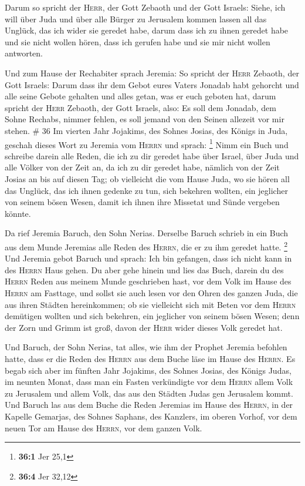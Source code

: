  Darum so spricht der \textsc{Herr}, der Gott Zebaoth und
der Gott Israels: Siehe, ich will über Juda und über alle Bürger zu
Jerusalem kommen lassen all das Unglück, das ich wider sie geredet habe,
darum dass ich zu ihnen geredet habe und sie nicht wollen hören, dass
ich gerufen habe und sie mir nicht wollen antworten.

 Und zum Hause der Rechabiter sprach Jeremia: So spricht
der \textsc{Herr} Zebaoth, der Gott Israels: Darum dass ihr dem Gebot
eures Vaters Jonadab habt gehorcht und alle seine Gebote gehalten und
alles getan, was er euch geboten hat,  darum spricht der
\textsc{Herr} Zebaoth, der Gott Israels, also: Es soll dem Jonadab, dem
Sohne Rechabs, nimmer fehlen, es soll jemand von den Seinen allezeit vor
mir stehen. \# 36  Im vierten Jahr Jojakims, des Sohnes
Josias, des Königs in Juda, geschah dieses Wort zu Jeremia vom
\textsc{Herrn} und sprach: \footnote{\textbf{36:1} Jer 25,1}
 Nimm ein Buch und schreibe darein alle Reden, die ich zu
dir geredet habe über Israel, über Juda und alle Völker von der Zeit an,
da ich zu dir geredet habe, nämlich von der Zeit Josias an bis auf
diesen Tag;  ob vielleicht die vom Hause Juda, wo sie
hören all das Unglück, das ich ihnen gedenke zu tun, sich bekehren
wollten, ein jeglicher von seinem bösen Wesen, damit ich ihnen ihre
Missetat und Sünde vergeben könnte.

 Da rief Jeremia Baruch, den Sohn Nerias. Derselbe Baruch
schrieb in ein Buch aus dem Munde Jeremias alle Reden des
\textsc{Herrn}, die er zu ihm geredet hatte. \footnote{\textbf{36:4} Jer
  32,12}  Und Jeremia gebot Baruch und sprach: Ich bin
gefangen, dass ich nicht kann in des \textsc{Herrn} Haus gehen.
 Du aber gehe hinein und lies das Buch, darein du des
\textsc{Herrn} Reden aus meinem Munde geschrieben hast, vor dem Volk im
Hause des \textsc{Herrn} am Fasttage, und sollst sie auch lesen vor den
Ohren des ganzen Juda, die aus ihren Städten hereinkommen;
 ob sie vielleicht sich mit Beten vor dem \textsc{Herrn}
demütigen wollten und sich bekehren, ein jeglicher von seinem bösen
Wesen; denn der Zorn und Grimm ist groß, davon der \textsc{Herr} wider
dieses Volk geredet hat.

 Und Baruch, der Sohn Nerias, tat alles, wie ihm der
Prophet Jeremia befohlen hatte, dass er die Reden des \textsc{Herrn} aus
dem Buche läse im Hause des \textsc{Herrn}.  Es begab sich
aber im fünften Jahr Jojakims, des Sohnes Josias, des Königs Judas, im
neunten Monat, dass man ein Fasten verkündigte vor dem \textsc{Herrn}
allem Volk zu Jerusalem und allem Volk, das aus den Städten Judas gen
Jerusalem kommt.  Und Baruch las aus dem Buche die Reden
Jeremias im Hause des \textsc{Herrn}, in der Kapelle Gemarjas, des
Sohnes Saphans, des Kanzlers, im oberen Vorhof, vor dem neuen Tor am
Hause des \textsc{Herrn}, vor dem ganzen Volk.


